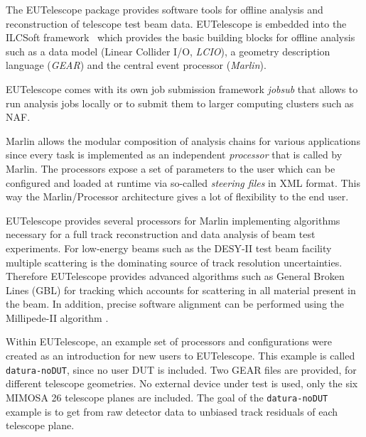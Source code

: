

The EUTelescope package \cite{ref:eutelwebsite} provides software tools for offline analysis and reconstruction of telescope test beam data. 
EUTelescope is embedded into the ILCSoft framework~\cite{ref:eudetmemo_2009_12} which provides the basic building blocks for offline analysis such as a data model (Linear Collider I/O, \emph{LCIO}),
a geometry description language (\emph{GEAR}) and the central event processor (\emph{Marlin}).


EUTelescope comes with its own job submission framework \emph{jobsub} that allows to run analysis jobs locally or to submit them to larger computing clusters such as NAF.

Marlin allows the modular composition of analysis chains for various applications since every task is implemented as an independent \emph{processor} that is called by Marlin. 
The processors expose a set of parameters to the user which can be configured and loaded at runtime via so-called \emph{steering files} in XML format.
This way the Marlin/Processor architecture gives a lot of flexibility to the end user. 

EUTelescope provides several processors for Marlin implementing algorithms necessary for a full track reconstruction and data analysis of beam test experiments. 
For low-energy beams such as the DESY-II test beam facility multiple scattering is the dominating source of track resolution uncertainties. 
Therefore EUTelescope provides advanced algorithms such as General Broken Lines (GBL) \cite{Kleinwort-2012} for tracking which accounts for scattering in all material present in the beam. 
In addition, precise software alignment can be performed using the Millipede-II algorithm \cite{Blobel-2006}.

\label{sec:datura-nodut}
Within EUTelescope, an example set of processors and configurations were created as an introduction for new users to EUTelescope.
This example is called \texttt{datura-noDUT}, since no user DUT is included.
Two GEAR files are provided, for different telescope geometries.
No external device under test is used, only the six MIMOSA 26 telescope planes are included.
The goal of the \texttt{datura-noDUT} example is to get from raw detector data to unbiased track residuals of each telescope plane.

